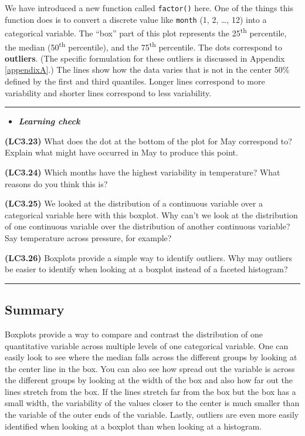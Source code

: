 \documentclass[]{tufte-book}
\let\oldrule=\rule
\renewcommand{\rule}[1]{\oldrule{\linewidth}}
\newenvironment{rmdblock}[1]
  {\begin{shaded*}
  \begin{itemize}
  \renewcommand{\labelitemi}{
    \raisebox{-.7\height}[0pt][0pt]{
    }
  }
  \item
  }
  {
  \end{itemize}
  \end{shaded*}
  }
\newenvironment{learncheck}
  {\begin{rmdblock}{warning}}
  {\end{rmdblock}}
\begin{document}
We have introduced a new function called \texttt{factor()} here. One of
the things this function does is to convert a discrete value like
\texttt{month} (1, 2, \ldots{}, 12) into a categorical variable. The
``box'' part of this plot represents the 25\textsuperscript{th}
percentile, the median (50\textsuperscript{th} percentile), and the
75\textsuperscript{th} percentile. The dots correspond to
\textbf{outliers}. (The specific formulation for these outliers is
discussed in Appendix \ref{appendixA}.) The lines show how the data
varies that is not in the center 50\% defined by the first and third
quantiles. Longer lines correspond to more variability and shorter lines
correspond to less variability.

\begin{center}\rule{0.5\linewidth}{\linethickness}\end{center}

\begin{learncheck}
\textbf{\emph{Learning check}}
\end{learncheck}

\textbf{(LC3.23)} What does the dot at the bottom of the plot for May
correspond to? Explain what might have occurred in May to produce this
point.

\textbf{(LC3.24)} Which months have the highest variability in
temperature? What reasons do you think this is?

\textbf{(LC3.25)} We looked at the distribution of a continuous variable
over a categorical variable here with this boxplot. Why can't we look at
the distribution of one continuous variable over the distribution of
another continuous variable? Say temperature across pressure, for
example?

\textbf{(LC3.26)} Boxplots provide a simple way to identify outliers.
Why may outliers be easier to identify when looking at a boxplot instead
of a faceted histogram?

\begin{center}\rule{0.5\linewidth}{\linethickness}\end{center}

\subsection{Summary}\label{summary-3}

Boxplots provide a way to compare and contrast the distribution of one
quantitative variable across multiple levels of one categorical
variable. One can easily look to see where the median falls across the
different groups by looking at the center line in the box. You can also
see how spread out the variable is across the different groups by
looking at the width of the box and also how far out the lines stretch
from the box. If the lines stretch far from the box but the box has a
small width, the variability of the values closer to the center is much
smaller than the variable of the outer ends of the variable. Lastly,
outliers are even more easily identified when looking at a boxplot than
when looking at a histogram.
\end{document}
